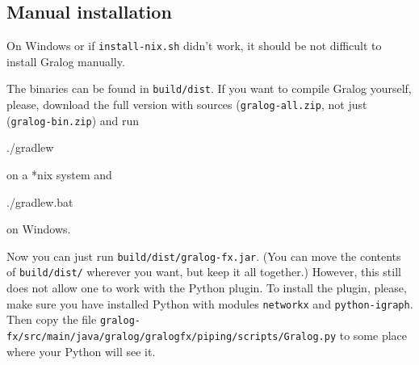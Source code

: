 \documentclass{article}
\begin{document}
\subsection{Manual installation}

On Windows or if \texttt{install-nix.sh} didn't work, it should be not
difficult to install Gralog manually.

The binaries can be found in \texttt{build/dist}. If you want to
compile Gralog yourself, please, download the full version with sources
(\texttt{gralog-all.zip}, not just (\texttt{gralog-bin.zip}) and run

\begin{tcolorbox}
  ./gradlew
\end{tcolorbox}
on a *nix system and

\begin{tcolorbox}
  ./gradlew.bat
\end{tcolorbox}
on Windows.

Now you can just run \texttt{build/dist/gralog-fx.jar}. (You can move
the contents of \texttt{build/dist/} wherever you want, but keep it
all together.) However, this still
does not allow one to work with the Python plugin. To install the plugin,
please, make sure you have installed Python with modules
\texttt{networkx} and \texttt{python-igraph}. Then copy the file
\texttt{gralog-fx/src/main/java/gralog/gralogfx/piping/scripts/Gralog.py}
to some place where your Python will see it.






\end{document}
